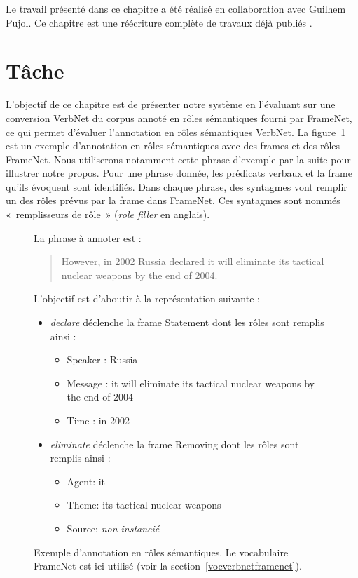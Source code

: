 Le travail présenté dans ce chapitre a été réalisé en collaboration avec
Guilhem Pujol. Ce chapitre est une réécriture complète de travaux déjà publiés
\citep{pradet2013revisiting}.

\section{Tâche}

L'objectif de ce chapitre est de présenter notre système en l'évaluant sur une
conversion VerbNet du corpus annoté en rôles sémantiques fourni par FrameNet,
ce qui permet d'évaluer l'annotation en rôles sémantiques VerbNet. La
figure~\ref{fig:srlrussia} est un exemple d'annotation en rôles sémantiques
avec des frames et des rôles FrameNet. Nous utiliserons notamment cette phrase
d'exemple par la suite pour illustrer notre propos. Pour une phrase donnée, les
prédicats verbaux et la frame qu'ils évoquent sont identifiés. Dans chaque
phrase, des syntagmes vont remplir un des rôles prévus par la frame dans
FrameNet. Ces syntagmes sont nommés «~remplisseurs de rôle~» (\textit{role
filler} en anglais).

\begin{figure}[t]
    La phrase à annoter est :

    \begin{quote}
    However, in 2002 Russia declared it will eliminate its tactical nuclear weapons by the end of 2004.
    \end{quote}

    L'objectif est d'aboutir à la représentation suivante :

    \begin{itemize}
        \item \textit{declare} déclenche la frame Statement dont les rôles sont remplis ainsi :
        \begin{itemize}
            \item Speaker : Russia
            \item Message : it will eliminate its tactical nuclear weapons by the end of 2004
            \item Time : in 2002
        \end{itemize}
        \item \textit{eliminate} déclenche la frame Removing dont les rôles sont remplis ainsi :
        \begin{itemize}
            \item Agent: it
            \item Theme: its tactical nuclear weapons
            \item Source: \textit{non instancié}
        \end{itemize}
    \end{itemize}
    \caption{\label{fig:srlrussia}Exemple d'annotation en rôles sémantiques. Le
    vocabulaire FrameNet est ici utilisé (voir la
section~\ref{vocverbnetframenet}).}

\end{figure}

